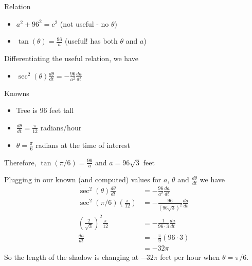\documentclass{ximera}
\begin{document}
\begin{exercise}
\begin{hint}
Relation

\begin{itemize}
\item
  $a^2+96^2 = c^2$ (not useful - no $\theta$)
\item
  $\tan(\theta) = \frac{96}{a}$ (useful! has both $\theta$ and $a$)
\end{itemize}

Differentiating the useful relation, we have

\begin{itemize}
\itemsep1pt\parskip0pt
\item
  $\sec^2(\theta)\frac{d\theta}{dt} = -\frac{96}{a^2}\frac{da}{dt}$
\end{itemize}

Knowns

\begin{itemize}
\item
  Tree is 96 feet tall
\item
  $\frac{d\theta}{dt} = \frac{\pi}{12}$ radians/hour
\item
  $\theta = \frac{\pi}{6}$ radians at the time of interest
\end{itemize}

Therefore, $\tan(\pi/6) = \frac{96}{a}$ and $a = 96\sqrt{3}$ feet

Plugging in our known (and computed) values for $a$, $\theta$ and
$\frac{d\theta}{dt}$ we have \begin{align*}
\sec^2(\theta)\frac{d\theta}{dt} &= -\frac{96}{a^2}\frac{da}{dt}\\
\sec^2(\pi/6)\left(\frac{\pi}{12}\right) &= -\frac{96}{(96\sqrt{3})^2}\frac{da}{dt} \\
\left(\frac{2}{\sqrt{3}}\right)^2\frac{\pi}{12} &= -\frac{1}{96\cdot 3}\frac{da}{dt} \\
\frac{da}{dt} &= -\frac{\pi}{9}\left(96\cdot 3\right)  \\
&= -32\pi
\end{align*} So the length of the shadow is changing at $-32\pi$ feet
per hour when $\theta = \pi/6$.
\end{hint}


\begin{multipleChoice}
\end{multipleChoice}

\end{exercise}
\end{document}
